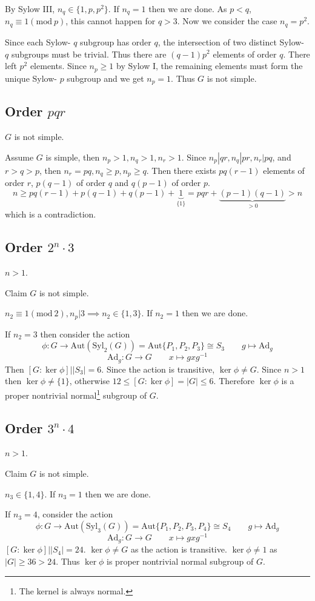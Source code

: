By Sylow III, $n_{q}\in \{ 1,p,p^2 \}$. If $n_{q}=1$ then we are done. As $p<q$, $n_{q}\equiv1(\mathrm{mod}\ p)$, this cannot happen for $q>3$. Now we consider the case $n_{q}=p^2$.

Since each Sylow- $q$ subgroup has order $q$, the intersection of two distinct Sylow- $q$ subgroups must be trivial. Thus there are $(q-1)p^2$ elements of order $q$. There left $p^2$ elements. Since $n_{p}\geq1$ by Sylow I, the remaining elements must form the unique Sylow- $p$ subgroup and we get $n_{p}=1$. Thus $G$ is not simple.

\subsection{Order \texorpdfstring{$pqr$}{pqr}}

$G$ is not simple.

Assume $G$ is simple, then $n_{p}>1,n_{q}>1,n_{r}>1$. Since $n_{p}|qr,n_{q}|pr,n_{r}|pq$, and $r>q>p$, then $n_{r}=pq, n_{q}\geq p,n_{p}\geq q$. Then there exists $pq(r-1)$ elements of order $r$, $p(q-1)$ of order $q$ and $q(p-1)$ of order $p$.
\[
n\geq pq(r-1)+p(q-1)+q(p-1)+\underbrace{ 1 }_{ \{ 1 \} }=pqr+\underbrace{ (p-1)(q-1) }_{ > 0 }>n
\]
which is a contradiction.

\subsection{Order \texorpdfstring{$2^{n}\cdot3$}{2^ncdot3}}

$n>1$.

Claim $G$ is not simple.

$n_{2}\equiv1 (\mathrm{mod}\ 2), n_{p}|3\implies n_2\in \{ 1,3 \}$. If $n_2=1$ then we are done.

If $n_2=3$ then consider the action
\[
\phi:G\to \mathrm{Aut}(\mathrm{Syl}_{2}(G))=\mathrm{Aut}\{ P_1,P_2,P_3 \}\cong S_3\qquad g\mapsto \mathrm{Ad}_{g}
\]
\[
\mathrm{Ad}_{g}:G\to G\qquad x\mapsto gxg^{-1}
\]
Then $[G:\ker \phi]|\lvert S_3 \rvert=6$. Since the action is transitive, $\ker \phi\neq G$. Since $n>1$ then $\ker \phi\neq \{ 1 \}$, otherwise $12\leq[G:\ker \phi]=\lvert G \rvert\leq6$. Therefore $\ker \phi$ is a proper nontrivial normal\footnote{The kernel is always normal.} subgroup of $G$.

\subsection{Order \texorpdfstring{$3^{n}\cdot4$}{3^ncdot4}}

$n>1$.

Claim $G$ is not simple.

$n_{3}\in \{ 1,4 \}$. If $n_3=1$ then we are done.

If $n_3=4$, consider the action
\[
\phi:G\to \mathrm{Aut}(\mathrm{Syl}_{3}(G))=\mathrm{Aut}\{ P_1,P_2,P_3,P_4 \}\cong S_4\qquad g\mapsto \mathrm{Ad}_{g}
\]
\[
\mathrm{Ad}_{g}:G\to G\qquad x\mapsto gxg^{-1}
\]
$[G:\ker \phi]|\lvert S_4 \rvert=24$. $\ker \phi\neq G$ as the action is transitive. $\ker \phi\neq1$ as $\lvert G \rvert\geq36>24$. Thus $\ker \phi$ is proper nontrivial normal subgroup of $G$.
